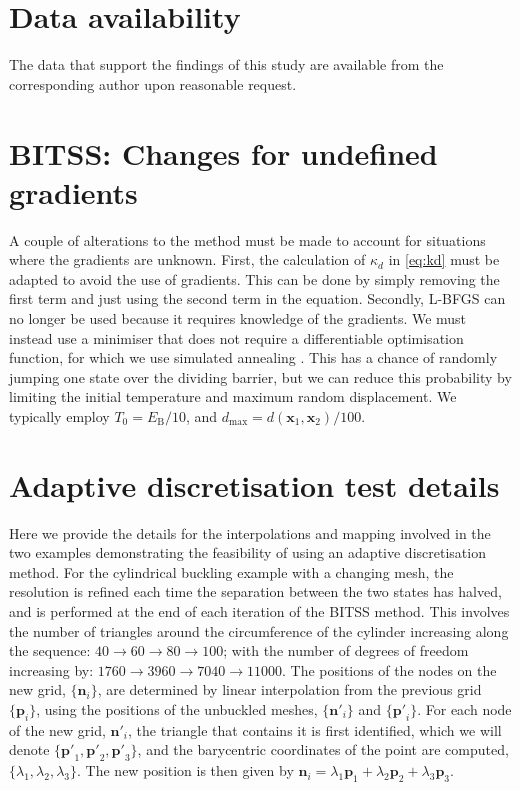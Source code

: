 \documentclass[aip,jcp,reprint,twocolumn]{revtex4-1}
\begin{document}
\section*{Data availability}
The data that support the findings of this study are available from the corresponding author upon reasonable request.


\appendix
\section{BITSS: Changes for undefined gradients}
A couple of alterations to the method must be made to account for situations where the gradients are unknown.
First, the calculation of $\kappa_d$ in \cref{eq:kd} must be adapted to avoid the use of gradients.
This can be done by simply removing the first term and just using the second term in the equation.
Secondly, L-BFGS can no longer be used because it requires knowledge of the gradients.
We must instead use a minimiser that does not require a differentiable optimisation function, for which we use simulated annealing \cite{Kirkpatrick1983}.
This has a chance of randomly jumping one state over the dividing barrier, but we can reduce this probability by limiting the initial temperature and maximum random displacement.
We typically employ $T_0 = E_\mathrm{B} / 10$, and $d_\mathrm{max} = d(\bm{x}_1, \bm{x}_2) / 100$.

\section{Adaptive discretisation test details}
Here we provide the details for the interpolations and mapping involved in the two examples demonstrating the feasibility of using an adaptive discretisation method.
For the cylindrical buckling example with a changing mesh, the resolution is refined each time the separation between the two states has halved, and is performed at the end of each iteration of the BITSS method.
This involves the number of triangles around the circumference of the cylinder increasing along the sequence: $40 \rightarrow 60 \rightarrow 80 \rightarrow 100$; with the number of degrees of freedom increasing by: $\num{1760} \rightarrow \num{3960} \rightarrow \num{7040} \rightarrow \num{11000}$.
The positions of the nodes on the new grid, $\{\bm{n}_i\}$, are determined by linear interpolation from the previous grid $\{\bm{p}_i\}$, using the positions of the unbuckled meshes, $\{\bm{n'}_i\}$ and $\{\bm{p'}_i\}$.
For each node of the new grid, $\bm{n'}_i$, the triangle that contains it is first identified, which we will denote $\{\bm{p'}_1,\bm{p'}_2,\bm{p'}_3\}$, and the barycentric coordinates of the point are computed, $\{\lambda_1,\lambda_2,\lambda_3\}$.
The new position is then given by $\bm{n}_i = \lambda_1 \bm{p}_1 + \lambda_2 \bm{p}_2 + \lambda_3 \bm{p}_3$.
\end{document}
